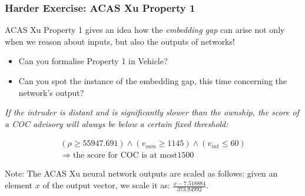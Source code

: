 \documentclass[t,compress,aspectratio=169]{beamer}
\begin{document}
\begin{frame}
\frametitle{Harder Exercise: ACAS Xu Property 1}
\vspace{-2em}
\small{
ACAS Xu Property 1 gives an idea how the {\it embedding gap}
 can arise not only when we reason about inputs, but also  the outputs of networks!

\begin{itemize}
\item Can you formalise Property 1 in Vehicle?
\item Can you spot the instance of the embedding gap, this time concerning the network's output?
\end{itemize}}

\pause

\begin{definition}
\small{\it If the intruder is distant and is significantly slower than the ownship, the score of a COC advisory will always be below a certain fixed threshold:}



\begin{equation*}
\begin{array}{l}
(\rho \geq 55947.691) \wedge
(v_{own} \geq 1145) \wedge (v_{int} \leq 60)  \\
\Rightarrow \text{the score for COC is at most} 1500
\end{array}
\end{equation*}
\end{definition}

\pause

\alert{Note:}
The ACAS Xu neural network outputs are scaled as follows: given an element $x$ of the output vector, we scale it as: $\frac{x - 7.518884}{373.94992}$. 


\end{frame}
\end{document}
